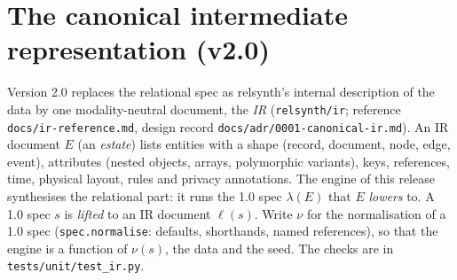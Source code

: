 \section{The canonical intermediate representation (v2.0)}\label{sec:v20}
Version 2.0 replaces the relational spec as relsynth's internal description of the data by one modality-neutral
document, the \emph{IR} (\texttt{relsynth/ir}; reference \texttt{docs/ir-reference.md}, design record
\texttt{docs/adr/0001-canonical-ir.md}). An IR document $E$ (an \emph{estate}) lists entities with a shape (record,
document, node, edge, event), attributes (nested objects, arrays, polymorphic variants), keys, references, time,
physical layout, rules and privacy annotations. The engine of this release synthesises the relational part: it runs
the 1.0 spec $\lambda(E)$ that $E$ \emph{lowers} to. A 1.0 spec $s$ is \emph{lifted} to an IR document $\ell(s)$.
Write $\nu$ for the normalisation of a 1.0 spec (\texttt{spec.normalise}: defaults, shorthands, named
references), so that the engine is a function of $\nu(s)$, the data and the seed. The checks are in
\texttt{tests/unit/test\_ir.py}.

